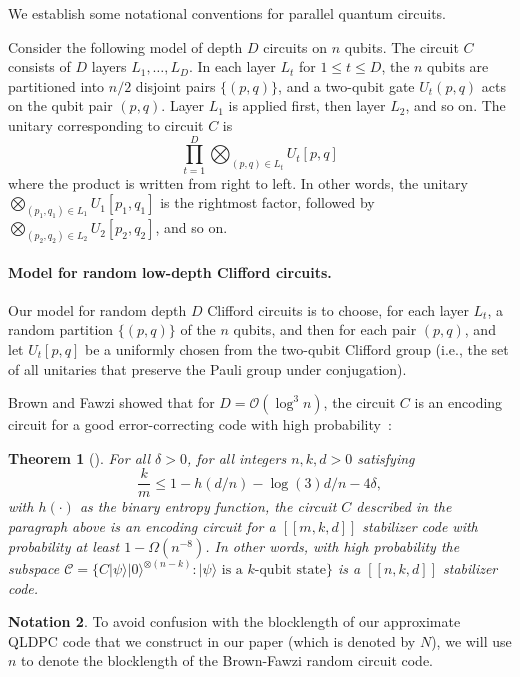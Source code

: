 \documentclass[11pt,letterpaper]{article}
\newtheorem{theorem}{Theorem}[section]
\theoremstyle{definition}
\newtheorem{notation}[theorem]{Notation}
\theoremstyle{remark}
\renewcommand{\leq}{\leqslant}
\numberwithin{equation}{section}
\let\origparagraph\paragraph
\renewcommand{\paragraph}[1]{\origparagraph{#1.}}
\theoremstyle{definition}
\newcommand{\ket}[1]{|#1\rangle}
\begin{document}
We establish some notational conventions for parallel quantum circuits. 

Consider the following model of depth $D$ circuits on $n$ qubits. The circuit $C$ consists of $D$ layers $L_1,\ldots,L_D$. In each layer $L_t$ for $1 \leq t \leq D$, the $n$ qubits are partitioned into $n/2$ disjoint pairs $\{ (p,q) \}$, and a two-qubit gate $U_t(p,q)$ acts on the qubit pair $(p,q)$. Layer $L_1$ is applied first, then layer $L_2$, and so on. The unitary corresponding to circuit $C$ is
\begin{equation}
  \prod_{t=1}^D \bigotimes_{(p,q) \in L_t} U_t[p,q]
\end{equation}
where the product is written from right to left. In other words, the unitary $\bigotimes_{(p_1,q_1) \in L_1} U_1[p_1,q_1]$ is the rightmost factor, followed by $\bigotimes_{(p_2,q_2) \in L_2} U_2[p_2,q_2]$, and so on.

\paragraph{Model for random low-depth Clifford circuits} Our model for random depth $D$ Clifford circuits is to choose, for each layer $L_t$, a random partition $\{ (p,q) \}$ of the $n$ qubits, and then for each pair $(p,q)$, and let $U_t[p,q]$ be a uniformly chosen from the two-qubit Clifford group (i.e., the set of all unitaries that preserve the Pauli group under conjugation). 

Brown and Fawzi showed that for $D = \mathcal{O}(\log^3 n)$, the circuit $C$ is an encoding circuit for a good error-correcting code with high probability~\cite{brown2013short}:

\begin{theorem}[\cite{brown2013short}]
\label{thm:bf}
  For all $\delta > 0$, for all integers $n,k,d > 0$ satisfying
  \begin{equation}
    \frac{k}{m} \leq 1 - h(d/n) - \log(3)d/n - 4\delta,
  \end{equation}
  with $h(\cdot)$ as the binary entropy function, the circuit $C$ described in the paragraph above is an encoding circuit for a $[[m,k,d]]$ stabilizer code with probability at least $1 - \Omega(n^{-8})$. In other words, with high probability the subspace $\mathcal{C} = \{ C \ket{\psi} \ket{0}^{\otimes (n-k)} : \text{$\ket{\psi}$ is a $k$-qubit state} \}$ is a $[[n,k,d]]$ stabilizer code.
\end{theorem}

\begin{notation}
  To avoid confusion with the blocklength of our approximate QLDPC code that we construct in our paper (which is denoted by $N$), we will use $n$ to denote the blocklength of the Brown-Fawzi random circuit code.
\end{notation}
\end{document}
